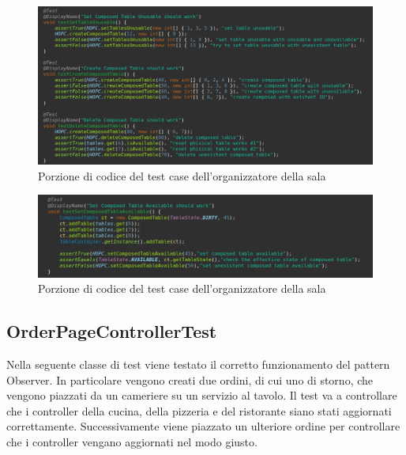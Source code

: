 \documentclass{article}
\begin{document}
\begin{figure}[!h]
\centering
\includegraphics[width= 14cm]{"Codice/TestHall1.PNG"}
\caption{Porzione di codice del test case dell'organizzatore della sala}
\end{figure}

\begin{figure}[!h]
\centering
\includegraphics[width= 14cm]{"Codice/TestHall2.PNG"}
\caption{Porzione di codice del test case dell'organizzatore della sala}
\end{figure}

\newpage

\subsection{OrderPageControllerTest}

Nella seguente classe di test viene testato il corretto funzionamento del pattern Observer. In particolare vengono creati due ordini, di cui uno di storno, che vengono piazzati da un cameriere su un servizio al tavolo. Il test va a controllare che i controller della cucina, della pizzeria e del ristorante siano stati aggiornati correttamente. Successivamente viene piazzato un ulteriore ordine per controllare che i controller vengano aggiornati nel modo giusto.
\end{document}
